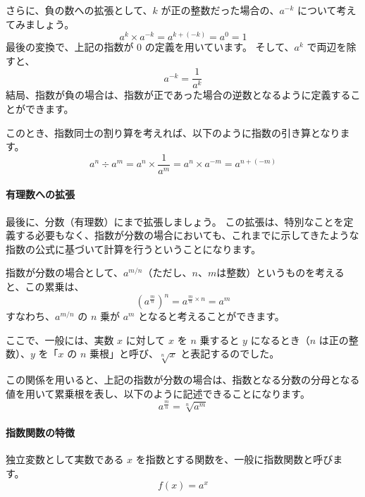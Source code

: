 \documentclass[uplatex,dvipdfmx,a4paper,11pt]{jsarticle}
\begin{document}
さらに、負の数への拡張として、$k$ が正の整数だった場合の、$a^{-k}$ について考えてみましょう。
\begin{equation*}
a^k \times a^{-k} = a^{k+(-k)}=a^0=1
\end{equation*}
最後の変換で、上記の指数が 0 の定義を用いています。
そして、$a^k$ で両辺を除すと、
\begin{equation*}
a^{-k} = \dfrac{1}{a^k}
\end{equation*}
結局、指数が負の場合は、指数が正であった場合の逆数となるように定義することができます。

このとき、指数同士の割り算を考えれば、以下のように指数の引き算となります。
\begin{equation*}
a^n \div a^m =a^n \times \dfrac{1}{a^m} = a^n \times a^{-m} = a^{n + (-m)}
\end{equation*}

\paragraph{有理数への拡張}
最後に、分数（有理数）にまで拡張しましょう。
この拡張は、特別なことを定義する必要もなく、指数が分数の場合においても、これまでに示してきたような指数の公式に基づいて計算を行うということになります。

指数が分数の場合として、$a^{m/n}$（ただし、$n$、$m$は整数）というものを考えると、この累乗は、
\begin{equation*}
(a^{\frac{m}{n}})^n=a^{\frac{m}{n} \times n}=a^m
\end{equation*}
すなわち、$a^{m/n}$ の $n$ 乗が $a^m$ となると考えることができます。

ここで、一般には、実数 $x$ に対して $x$ を $n$ 乗すると $y$ になるとき（$n$ は正の整数）、$y$ を「$x$ の $n$ 乗根」と呼び、$\sqrt[n]{x}$ と表記するのでした。

この関係を用いると、上記の指数が分数の場合は、指数となる分数の分母となる値を用いて累乗根を表し、以下のように記述できることになります。
\begin{equation*}
a^{\frac{m}{n}}=\sqrt[n]{a^m}
\end{equation*}

\paragraph{指数関数の特徴}
独立変数として実数である $x$ を指数とする関数を、一般に指数関数と呼びます。
\begin{equation*}
f(x)=a^x
\end{equation*}
\end{document}
